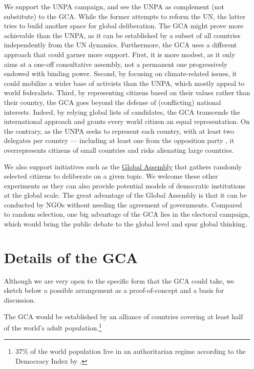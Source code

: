 \documentclass[12pt,english]{article}
\begin{document}
We support the UNPA campaign, and see the UNPA as complement (not substitute) to the GCA. While the former attempts to reform the UN, the latter tries to build another space for global deliberation. The GCA might prove more achievable than the UNPA, as it can be established by a subset of all countries independently from the UN dynamics. Furthermore, the GCA uses a different approach that could garner more support. First, it is more modest, as it only aims at a one-off consultative assembly, not a permanent one progressively endowed with binding power. Second, by focusing on climate-related issues, it could mobilize a wider base of activists than the UNPA, which mostly appeal to world federalists.  Third, by representing citizens based on their values rather than their country, the GCA goes beyond the defense of (conflicting) national interests. Indeed, by relying global lists of candidates, the GCA transcends the international approach and grants every world citizen an equal representation. On the contrary, as the UNPA seeks to represent each country, with at least two delegates per country --- including at least one from the opposition party \citep{leinen_world_2018}, it overrepresents citizens of small countries and risks alienating large countries. 

We also support initiatives such as the \href{https://globalassembly.org/}{Global Assembly} that gathers randomly selected citizens to deliberate on a given topic. We welcome these other experiments as they can also provide potential models of democratic institutions at the global scale. The great advantage of the Global Assembly is that it can be conducted by NGOs without needing the agreement of governments. Compared to random selection, one big advantage of the GCA lies in the electoral campaign, which would bring the public debate to the global level and spur global thinking.%


\section{Details of the GCA}\label{sec:details}

Although we are very open to the specific form that the GCA could take, we sketch below a possible arrangement as a proof-of-concept and a basis for discussion. 

The GCA would be established by an alliance of countries covering at least half of the world's adult population.\footnote{37\% of the world population live in an authoritarian regime according to the Democracy Index by \citet{eiu_democracy_2022}.} 
\end{document}
